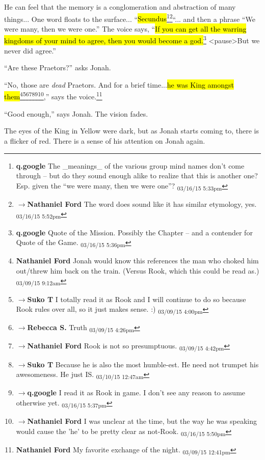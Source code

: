 He can feel that the memory is a conglomeration and abstraction of many things... One word floats to the surface... ``\hl{Secundus}\footnote{\textbf{q.google }The \_meanings\_ of the various group mind names don't come through -- but do they sound enough alike to realize that this is another one?  Esp. given the ``we were many, then we were one''? \textsubscript{03/16/15 5:33pm}}\footnote{$\rightarrow$\textbf{Nathaniel Ford }The word does sound like it has similar etymology, yes. \textsubscript{03/16/15 5:52pm}}``... and then a phrase ``We were many, then we were one.''  The voice says, ``\hl{If you can get all the warring kingdoms of your mind to agree, then you would become a god.}\footnote{\textbf{q.google }Quote of the Mission.  Possibly the Chapter -- and a contender for Quote of the Game. \textsubscript{03/16/15 5:36pm}} \textless pause\textgreater   But we never did agree.''

``Are these Praetors?'' asks Jonah.

``No, those are \textit{dead} Praetors.  And for a brief time...\hl{he was King amongst them}\footnote{\textbf{Nathaniel Ford }Jonah would know this references the man who choked him out/threw him back on the train. (Versus Rook, which this could be read as.) \textsubscript{03/09/15 9:12am}}\footnote{$\rightarrow$\textbf{Suko T }I totally read it as Rook and I will continue to do so because Rook rules over all, so it just makes sense. :) \textsubscript{03/09/15 4:00pm}}\footnote{$\rightarrow$\textbf{Rebecca S. }Truth \textsubscript{03/09/15 4:26pm}}\footnote{$\rightarrow$\textbf{Nathaniel Ford }Rook is not so presumptuous. \textsubscript{03/09/15 4:42pm}}\footnote{$\rightarrow$\textbf{Suko T }Because he is also the most humble-est.  He need not trumpet his awesomeness. He just IS. \textsubscript{03/10/15 12:47am}}\footnote{$\rightarrow$\textbf{q.google }I read it as Rook in game.  I don't see any reason to assume otherwise yet. \textsubscript{03/16/15 5:37pm}}\footnote{$\rightarrow$\textbf{Nathaniel Ford }I was unclear at the time, but the way he was speaking would cause the 'he' to be pretty clear as not-Rook. \textsubscript{03/16/15 5:50pm}},'' says the voice.\footnote{\textbf{Nathaniel Ford }My favorite exchange of the night. \textsubscript{03/09/15 12:41pm}}

``Good enough,'' says Jonah.  The vision fades.



The eyes of the King in Yellow were dark, but as Jonah starts coming to, there is a flicker of red.  There is a sense of his attention on Jonah again.

